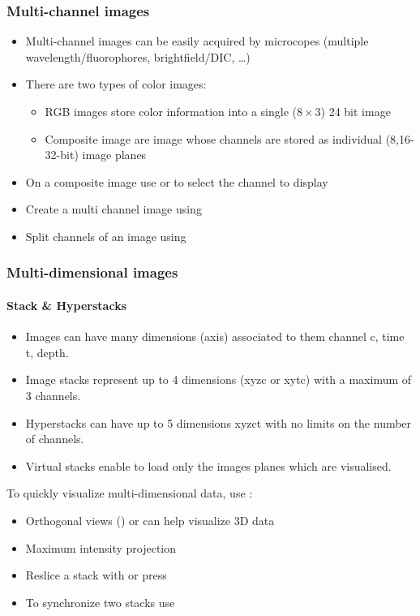 \documentclass[ignorenonframetext,aspectratio=169,10pt,xcolor=table]{beamer}
\begin{document}
\begin{frame} \frametitle{Multi-channel images}

  \begin{itemize} \setlength\itemsep{1em}
    \item Multi-channel images can be easily acquired by microcopes
      (multiple wavelength/fluorophores, brightfield/DIC, \dots)
    \item There are two types of color images:
      \begin{itemize}
      \item RGB images store color information into a single ($8 \times
        3$) 24 bit image
      \item Composite image are image whose channels are stored as
        individual (8,16-32-bit) image planes
      \end{itemize}
    \item On a composite image use  or
       to select the channel to display
    \item Create a multi channel image using 
    \item Split channels of an image using 
  \end{itemize}

\end{frame}


\begin{frame} \frametitle{Multi-dimensional images}
  \framesubtitle{Stack \& Hyperstacks}
  \begin{itemize} \setlength\itemsep{1em}
    \item Images can have many dimensions (axis) associated to them
      channel c, time t, depth.
    \item Image stacks represent up to 4 dimensions (xyzc or xytc) with
      a maximum of 3 channels.
    \item Hyperstacks can have up to 5 dimensions xyzct with no limits
      on the number of channels.
    \item Virtual stacks enable to load only the images planes which are
      visualised.
  \end{itemize}

  To quickly visualize multi-dimensional data, use :

  \begin{itemize}
    \item Orthogonal views () or
       can help visualize 3D data
    \item Maximum intensity projection 
    \item Reslice a stack with  or press \keys{/}
    \item To synchronize two stacks use 
  \end{itemize}
\end{frame}
\end{document}
